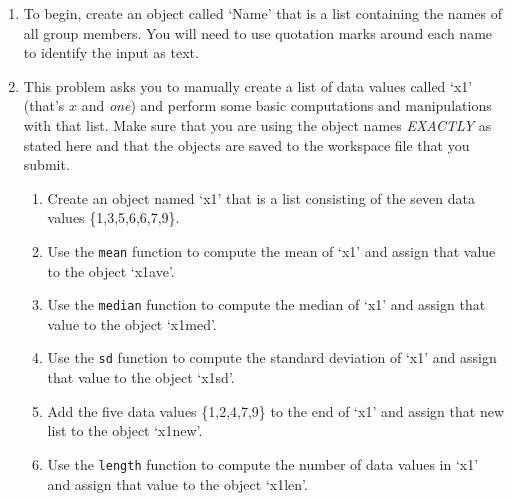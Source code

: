 \documentclass{article}
\begin{document}
\begin{enumerate}

\item To begin, create an object called `Name' that is a list containing the names of all group members. You will need to use quotation marks around each name to identify the input as text.

\item This problem asks you to manually create a list of data values called `x1' (that's $x$ and {\em one}) and perform some basic computations and manipulations with that list. Make sure that you are using the object names {\em EXACTLY} as stated here and that the objects are saved to the workspace file that you submit.
	\begin{enumerate}
	\item Create an object named `x1' that is a list consisting of the seven data values \{1,3,5,6,6,7,9\}.
	\item Use the \texttt{mean} function to compute the mean of `x1' and assign that value to the object `x1ave'.
	\item Use the \texttt{median} function to compute the median of `x1' and assign that value to the object `x1med'.
	\item Use the \texttt{sd} function to compute the standard deviation of `x1' and assign that value to the object `x1sd'.
	\item Add the five data values \{1,2,4,7,9\} to the end of `x1' and assign that new list to the object `x1new'.
	\item Use the \texttt{length} function to compute the number of data values in `x1' and assign that value to the object `x1len'.
	\end{enumerate}
	

\end{enumerate}
\end{document}
